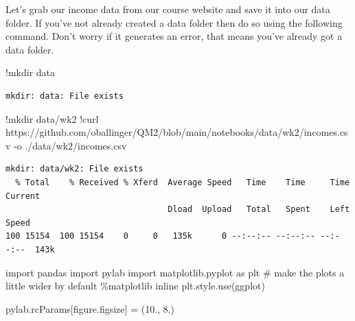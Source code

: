\documentclass[
  letterpaper,
  DIV=11,
  numbers=noendperiod]{scrreprt}
\newenvironment{Shaded}{\begin{snugshade}}{\end{snugshade}}
\newcommand{\CommentTok}[1]{\textcolor[rgb]{0.37,0.37,0.37}{#1}}
\newcommand{\FloatTok}[1]{\textcolor[rgb]{0.68,0.00,0.00}{#1}}
\newcommand{\ImportTok}[1]{\textcolor[rgb]{0.00,0.46,0.62}{#1}}
\newcommand{\NormalTok}[1]{\textcolor[rgb]{0.00,0.23,0.31}{#1}}
\newcommand{\OperatorTok}[1]{\textcolor[rgb]{0.37,0.37,0.37}{#1}}
\newcommand{\StringTok}[1]{\textcolor[rgb]{0.13,0.47,0.30}{#1}}
\begin{document}
Let's grab our income data from our course website and save it into our
data folder. If you've not already created a data folder then do so
using the following command. Don't worry if it generates an error, that
means you've already got a data folder.

\begin{Shaded}
\begin{Highlighting}[]
\OperatorTok{!}\NormalTok{mkdir data}
\end{Highlighting}
\end{Shaded}

\begin{verbatim}
mkdir: data: File exists
\end{verbatim}

\begin{Shaded}
\begin{Highlighting}[]
\OperatorTok{!}\NormalTok{mkdir data}\OperatorTok{/}\NormalTok{wk2}
\OperatorTok{!}\NormalTok{curl https:}\OperatorTok{//}\NormalTok{github.com}\OperatorTok{/}\NormalTok{oballinger}\OperatorTok{/}\NormalTok{QM2}\OperatorTok{/}\NormalTok{blob}\OperatorTok{/}\NormalTok{main}\OperatorTok{/}\NormalTok{notebooks}\OperatorTok{/}\NormalTok{data}\OperatorTok{/}\NormalTok{wk2}\OperatorTok{/}\NormalTok{incomes.csv }\OperatorTok{{-}}\NormalTok{o .}\OperatorTok{/}\NormalTok{data}\OperatorTok{/}\NormalTok{wk2}\OperatorTok{/}\NormalTok{incomes.csv}
\end{Highlighting}
\end{Shaded}

\begin{verbatim}
mkdir: data/wk2: File exists
  % Total    % Received % Xferd  Average Speed   Time    Time     Time  Current
                                 Dload  Upload   Total   Spent    Left  Speed
100 15154  100 15154    0     0   135k      0 --:--:-- --:--:-- --:--:--  143k
\end{verbatim}

\begin{Shaded}
\begin{Highlighting}[]
\ImportTok{import}\NormalTok{ pandas}
\ImportTok{import}\NormalTok{ pylab}
\ImportTok{import}\NormalTok{ matplotlib.pyplot }\ImportTok{as}\NormalTok{ plt}
\CommentTok{\# make the plots a little wider by default}
\OperatorTok{\%}\NormalTok{matplotlib inline}
\NormalTok{plt.style.use(}\StringTok{\textquotesingle{}ggplot\textquotesingle{}}\NormalTok{)}

\NormalTok{pylab.rcParams[}\StringTok{\textquotesingle{}figure.figsize\textquotesingle{}}\NormalTok{] }\OperatorTok{=}\NormalTok{ (}\FloatTok{10.}\NormalTok{, }\FloatTok{8.}\NormalTok{)}
\end{Highlighting}
\end{Shaded}
\end{document}
